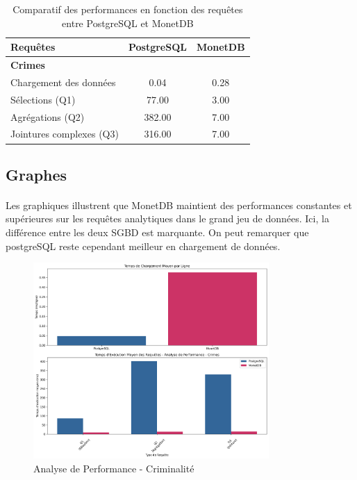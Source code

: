 \documentclass[11pt]{extarticle}
\begin{document}
\begin{table}[ht]
    \centering
    \setlength\arrayrulewidth{1pt}
    \def\arraystretch{0.82}
    \begin{tabular}{|l|c|c|}
    \hline
         \textbf{Requêtes} &  \textbf{PostgreSQL}
         & \textbf{MonetDB} \\ \hline
         \rowcolor[HTML]{343434} 
                    {\color[HTML]{FFFFFF} \textbf{Crimes}} &  & \\ \hline
                    Chargement des données & \cellcolor[HTML]{FCBF01}0.04 &0.28  \\ \hline
                    Sélections (Q1) & 77.00 & \cellcolor[HTML]{32C423}3.00 \\ \hline
                    Agrégations (Q2) & 382.00 & \cellcolor[HTML]{32C423}7.00 \\ \hline
                    Jointures complexes (Q3) & 316.00 & \cellcolor[HTML]{32C423}7.00 \\ \hline
                    
                    
    \end{tabular}
    \caption{Comparatif des performances en fonction des requêtes entre PostgreSQL et MonetDB}
    \label{tab:my_label}
\end{table}

\subsection{Graphes}
\paragraph{}
Les graphiques illustrent que MonetDB maintient des performances constantes et supérieures sur les requêtes analytiques dans le grand jeu de données. Ici, la différence entre les deux SGBD est marquante. On peut remarquer que postgreSQL reste cependant meilleur en chargement de données.

  
  \begin{figure}[H]
      \centering
      \includegraphics[width=0.8\textwidth]{images/crimes_performance.png}
      \caption{Analyse de Performance - Criminalité}
      \label{fig:performance_crimes}
  \end{figure}
\end{document}
